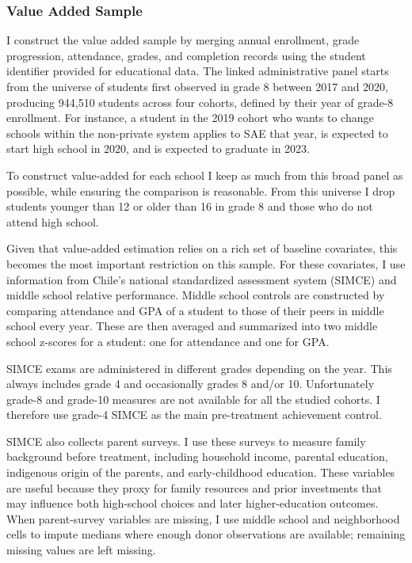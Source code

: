 \documentclass[a4paper, article, english, oneside, unknownkeysallowed, 12pt]{memoir}
\begin{document}
\subsubsection{Value Added Sample}

I construct the value added sample by merging annual enrollment, grade progression, attendance, grades, and completion records using the student identifier provided for educational data.
The linked administrative panel starts from the universe of students first observed in grade 8 between 2017 and 2020, producing 944,510 students across four cohorts, defined 
by their year of grade-8 enrollment. 
For instance, a student in the 2019 cohort who wants to change schools within the non-private system applies to SAE that year, is expected to start high school in 2020, and is expected to graduate in 2023.


To construct value-added for each school I keep as much from this broad panel as possible, while ensuring the comparison is reasonable.
From this universe I drop students younger than 12 or older than 16 in grade 8 and those who do not attend high school. 


Given that value-added estimation relies on a rich set of baseline covariates, this becomes the most important restriction on this sample.
For these covariates, I use information from Chile's national standardized assessment system (SIMCE) and middle school relative performance.
Middle school controls are constructed by comparing attendance and GPA of a student to those of their peers in middle school every year. 
These are then averaged and summarized into two middle school z-scores for a student: one for attendance and one for GPA.

SIMCE exams are administered in different grades depending on the year. 
This always includes grade 4 and occasionally grades 8 and/or 10.
Unfortunately grade-8 and grade-10 measures are not available for all the studied cohorts.
I therefore use grade-4 SIMCE as the main pre-treatment achievement control.

SIMCE also collects parent surveys.
I use these surveys to measure family background before treatment, including household income, parental education, indigenous origin of the parents, and early-childhood education.
These variables are useful because they proxy for family resources and prior investments that may influence both high-school choices and later higher-education outcomes.
When parent-survey variables are missing, I use middle school and neighborhood cells to impute medians where enough donor observations are available; remaining missing values are left missing.
\end{document}
